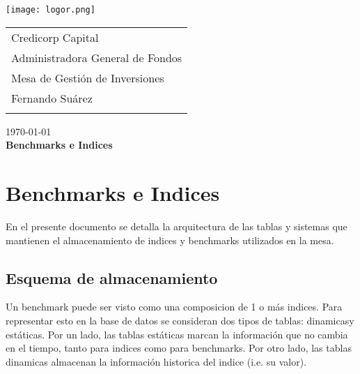 \documentclass{article}
\begin{document}
\texttt{[image: logor.png]}
\vspace*{-1.55cm}

\hspace*{1.4 cm}
 \hspace*{2.9 cm}
 {\footnotesize
 \begin{tabular}{l}
  \sc Credicorp Capital\\
  \sc Administradora General de Fondos \\
  \sc Mesa de Gestión de Inversiones  \\
  \sc Fernando Suárez  \\
  \vspace{15\baselineskip}\mbox{}
  \vspace{-3mm}\mbox{}
 \end{tabular}
}

 \bigskip

\vspace*{5mm}
\begin{center}
{\today} \\
\vspace{3mm}
{\Large\bf Benchmarks e Indices} \\
\vspace{2mm}
\end{center}
\section{Benchmarks e Indices}


En el presente documento se detalla la arquitectura de las tablas y sistemas que mantienen el almacenamiento de indices y benchmarks utilizados en la mesa.


\subsection{Esquema de almacenamiento}


\par Un benchmark puede ser visto como una composicion de 1 o más indices. Para representar esto en la base de datos se consideran dos tipos de tablas: dinamicasy estáticas. Por un lado, las tablas estáticas marcan la información que no cambia en el tiempo, tanto para indices como para benchmarks. Por otro lado, las tablas dinamicas almacenan la información historica del indice (i.e. su valor).
\end{document}
